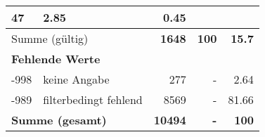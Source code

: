 \begin{longtable}{lXrrr}
       \num{47} &
       \num[round-mode=places,round-precision=2]{2,85} &
         \num[round-mode=places,round-precision=2]{0,45} \\
     \midrule
     \multicolumn{2}{l}{Summe (gültig)} &
       \textbf{\num{1648}} &
     \textbf{100} &
       \textbf{\num[round-mode=places,round-precision=2]{15,7}} \\
     \multicolumn{5}{l}{\textbf{Fehlende Werte}}\\
       -998 &
       keine Angabe &
         \num{277} &
        - &
         \num[round-mode=places,round-precision=2]{2,64} \\
       -989 &
       filterbedingt fehlend &
         \num{8569} &
        - &
         \num[round-mode=places,round-precision=2]{81,66} \\
     \midrule
     \multicolumn{2}{l}{\textbf{Summe (gesamt)}} &
          \textbf{\num{10494}} &
        \textbf{-} &
        \textbf{100} \\
     \bottomrule
     \end{longtable}
     
